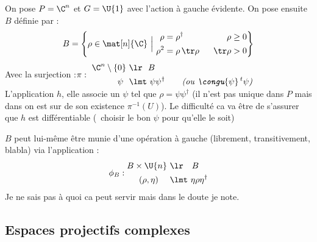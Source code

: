 On pose $P=\C^n$ et $G=\U{1}$ avec l'action à gauche évidente. On pose ensuite $B$ définie par :
\[B=\left\{\rho \in \mat[n]{\C}\ \Big|\ \begin{aligned} \rho &= \rho^\dagger\ &\ \rho &\geq 0 \\ \rho^2 &= \rho\, \tr\rho\ &\ \tr\rho &> 0  \end{aligned}\right\}\]
Avec la surjection :\qquad\qquad\qquad $\displaystyle \pi :\ \begin{aligned}
	\C^n\setminus\{0\}\ &\lr\ \ B \\ \psi\ \ &\lmt\ \psi\psi^\dagger 
	\qquad \textit{(ou $\congu{\psi}\, ^t\psi$)} \end{aligned}$ \\
L'application $h$, elle associe un $\psi$ tel que $\rho=\psi\psi^\dagger$ (il n'est pas unique dans $P$ mais dans on est sur de son existence $\pi^{-1}(U)$). Le difficulté ca va être de s'assurer que $h$ est différentiable (\ie~choisir le bon $\psi$ pour qu'elle le soit)
\begin{remarque}
	$B$ peut lui-même être munie d'une opération à gauche (librement, transitivement, blabla) via l'application :
	\[\phi_B : \begin{aligned}B\times \U{n}\ &\lr\quad B \\ (\rho, \eta)\quad\ &\lmt\ \eta \rho \eta^\dagger
	\end{aligned}\]
	Je ne sais pas à quoi ca peut servir mais dans le doute je note.
\end{remarque}




\subsection{Espaces projectifs complexes}

